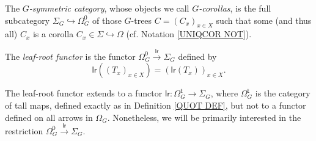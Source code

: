 \documentclass[a4paper,10pt]{article}%
\begin{document}
\begin{definition}
	The \textit{$G$-symmetric category},
	whose objects we call \textit{$G$-corollas}, is the full subcategory 
	$\Sigma_G \hookrightarrow \Omega_{G}^0$ of those $G$-trees
	$C = (C_x)_{x \in X}$ such that some (and thus all) $C_x$ is a corolla $C_x \in \Sigma \hookrightarrow \Omega$
	(cf. Notation \ref{UNIQCOR NOT}).
\end{definition}


\begin{definition}
	The \textit{leaf-root functor} is the functor $\Omega_{G}^0 \xrightarrow{\mathsf{lr}} \Sigma_G$ defined by 
\[
	\mathsf{lr}\left((T_x)_{x \in X}\right)=
	\left(\mathsf{lr}(T_x)\right)_{x \in X}.
\]
\end{definition}


\begin{remark}
	The leaf-root functor extends 
	to a functor $\mathsf{lr} \colon \Omega^{\mathsf{t}}_G \to \Sigma_G$, 
	where $\Omega^{\mathsf{t}}_G$ is the category of tall maps, defined exactly as in Definition \ref{QUOT DEF}, but not to a functor defined on all arrows in $\Omega_G$.
	Nonetheless, we will be primarily interested in the 
 restriction  
	$\Omega_{G}^0 \xrightarrow{\mathsf{lr}} \Sigma_G$.
\end{remark}
\end{document}
